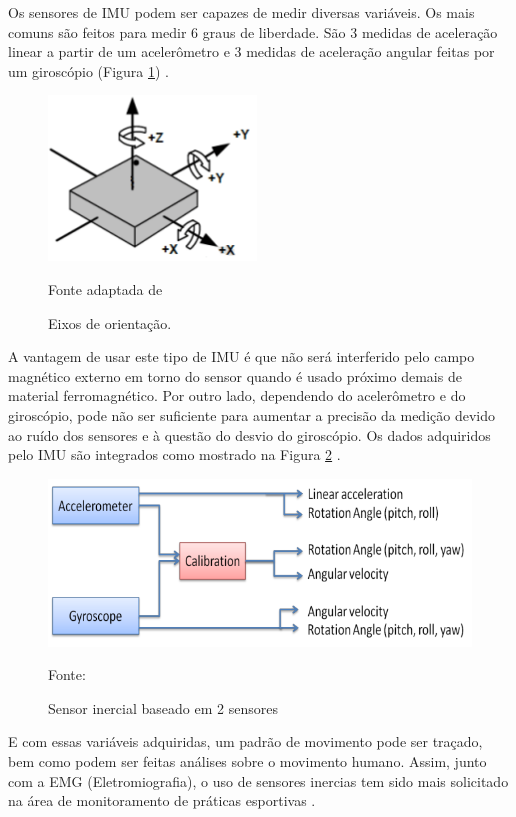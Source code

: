 		Os sensores de IMU podem ser capazes de medir diversas variáveis. Os mais comuns são feitos para medir 6 graus de liberdade. São 3 medidas de aceleração linear a partir de um acelerômetro e 3 medidas de aceleração angular feitas por um giroscópio (Figura \ref{eixos_imu}) \cite{santos2016}.
		 
		\begin{figure}[h]
			\centering
			\includegraphics[keepaspectratio=true,scale=0.8]{figuras/Eixos_imu.png}
			\caption{Eixos de orientação.}
			Fonte adaptada de \cite{mpu6050}
			\label{eixos_imu}	
		\end{figure}


		A vantagem de usar este tipo de IMU é que não será interferido pelo campo magnético externo em torno do
		sensor quando é usado próximo demais de material ferromagnético. Por outro lado, dependendo do acelerômetro e do giroscópio, pode não ser suficiente para aumentar a precisão da medição devido ao ruído dos sensores e à questão do desvio do giroscópio. Os dados adquiridos pelo IMU são integrados como mostrado na Figura \ref{integracao_imu} \cite{ahmad2013}.

		\begin{figure}[h]
			\centering
			\includegraphics[keepaspectratio=true,scale=0.3
			]{figuras/integracao_imu.png}
			\caption{Sensor inercial baseado em 2 sensores}
			Fonte: \cite{ahmad2013}
			\label{integracao_imu}
			
		\end{figure}

		E com essas variáveis adquiridas, um padrão de movimento pode ser traçado, bem como podem ser feitas análises sobre o movimento humano. Assim, junto com a EMG (Eletromiografia), o uso de sensores inercias tem sido mais solicitado na área de monitoramento de práticas esportivas \cite{howard2016}.
		

